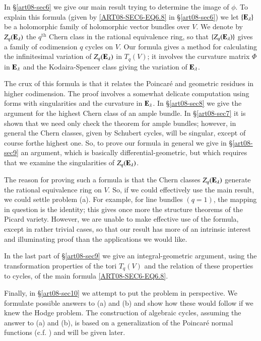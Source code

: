 In \S\ref{art08-sec6} we give our main result trying to determine the image of $\phi$. To explain this formula (given by \eqref{ART08-SEC6-EQ6.8} in \S\ref{art08-sec6}) we let $\{\mathbf{E}_{\lambda}\}$ be a holomorphic family of holomorphic vector bundles over $V$. We denote by $Z_{q}(\mathbf{E}_{\lambda})$ the $q^{\text{th}}$ Chern class in the rational equivalence ring, so that $\{Z_{q}(\mathbf{E}_{\lambda})\}$ gives a family of codimension $q$ cycles on $V$. Our formula gives a method for calculating the infinitesimal variation of $Z_{q}(\mathbf{E}_{\lambda})$ in $T_{q}(V)$; it involves the curvature matrix $\Phi$ in $\mathbf{E}_{\lambda}$ and the Kodaira-Spencer class giving the variation of $\mathbf{E}_{\lambda}$.

The crux of this formula is that it relates the Poincar\'e and geometric residues in higher codimension. The proof involves a somewhat delicate computation using forms with singularities and the curvature in $\mathbf{E}_{\lambda}$. In \S\ref{art08-sec8} we give the argument for the highest Chern class of an ample bundle. In \S\ref{art08-sec7} it is shown that we need only check the theorem for ample bundles; however, in general the Chern classes, given by Schubert cycles, will be singular, except of course for\pageoriginale the highest one. So, to prove our formula in general we give in \S\ref{art08-sec9} an argument, which is basically differential-geometric, but which requires that we examine the singularities of $Z_{q}(\mathbf{E}_{\lambda})$.

The reason for proving such a formula is that the Chern classes $Z_{q}(\mathbf{E}_{\lambda})$ generate the rational equivalence ring on $V$. So, if we could effectively use the main result, we could settle problem (a). For example, for line bundles $(q=1)$, the mapping in question is the identity; this gives once more the structure theorems of the Picard variety. However, we are unable to make effective use of the formula, except in rather trivial cases, so that our result has more of an intrinsic interest and illuminating proof than the applications we would like.

In the last part of \S\ref{art08-sec9} we give an integral-geometric argument, using the transformation properties of the tori $T_{q}(V)$ and the relation of these properties to cycles, of the main formula \eqref{ART08-SEC6-EQ6.8}.

Finally, in \S\ref{art08-sec10} we attempt to put the problem in perspective. We formulate possible answers to (a) and (b) and show how these would follow if we knew the Hodge problem. The construction of algebraic cycles, assuming the answer to (a) and (b), is based on a generalization of the Poincar\'e normal functions (c.f. \cite{art08-key19}) and will be given later.

